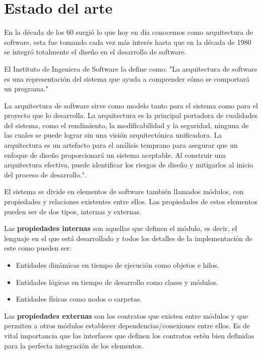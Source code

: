 \documentclass[12pt]{report} %
\begin{document}
	\chapter{Estado del arte}

	En la década de los 60 surgió lo que hoy en día conocemos como arquitectura de software, esta fue tomando cada vez más interés hasta que en la década de 1980 se integró totalmente el diseño en el desarrollo de software. 
	
	El Instituto de Ingeniera de Software la define como:
	"La arquitectura de software es una representación del sistema que ayuda a comprender cómo se comportará un programa."
	
	La arquitectura de software sirve como modelo tanto para el sistema como para el proyecto que lo desarrolla. La arquitectura es la principal portadora de cualidades del sistema, como el rendimiento, la modificabilidad y la seguridad, ninguna de las cuales se puede lograr sin una visión arquitectónica unificadora. La arquitectura es un artefacto para el análisis temprano para asegurar que un enfoque de diseño proporcionará un sistema aceptable. Al construir una arquitectura efectiva, puede identificar los riesgos de diseño y mitigarlos al inicio del proceso de desarrollo."\cite{SoftwareEngineeringInstitute}. 
	
	El sistema se divide en elementos de software también llamados módulos, con propiedades y relaciones existentes entre ellos. Las propiedades de estos elementos pueden ser de dos tipos, internas y externas.
	
	Las \textbf{propiedades internas}  son aquellas que definen el módulo, es decir, el lenguaje en el que está desarrollado y todos los detalles de la implementación de este como pueden ser:
	
	\begin{itemize}
		\item Entidades dinámicas en tiempo de ejecución como objetos e hilos.
		\item Entidades lógicas en tiempo de desarrollo como clases y módulos.
		\item Entidades físicas como nodos o carpetas.
	\end{itemize}
	
	Las \textbf{propiedades externas} son los contratos que existen entre módulos y que permiten a otros módulos establecer dependencias/conexiones entre ellos. Es de vital importancia que las interfaces que definen los contratos estén bien definidas para la perfecta integración de los elementos.
	
\end{document}
